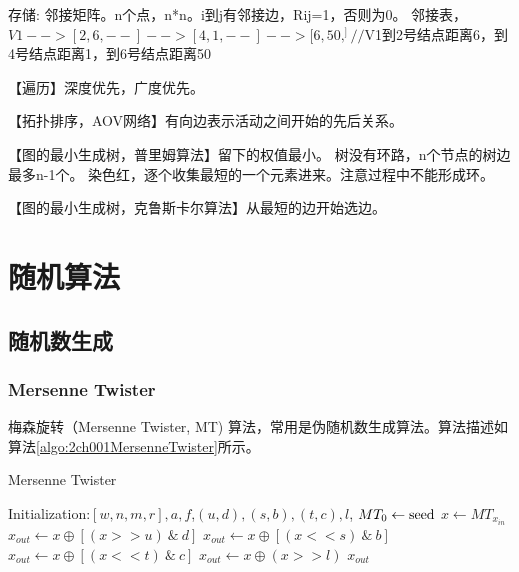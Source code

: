 \documentclass[UTF8]{../computerUniverse}
\begin{document}
存储: 
邻接矩阵。n个点，n*n。i到j有邻接边，Rij=1，否则为0。
邻接表，$V1-->[2,6,--]-->[4,1,--]-->[6,50,^]//$V1到2号结点距离6，到4号结点距离1，到6号结点距离50

【遍历】深度优先，广度优先。

【拓扑排序，AOV网络】有向边表示活动之间开始的先后关系。

【图的最小生成树，普里姆算法】留下的权值最小。
树没有环路，n个节点的树边最多n-1个。
染色红，逐个收集最短的一个元素进来。注意过程中不能形成环。

【图的最小生成树，克鲁斯卡尔算法】从最短的边开始选边。




\chapter{随机算法}


\section{随机数生成}

\subsection{Mersenne Twister}
梅森旋转（Mersenne Twister, MT) 算法，常用是伪随机数生成算法。算法描述如算法\ref{algo:2ch001MersenneTwister}所示。

      \begin{algorithm}[ht]
        \caption{Mersenne Twister}\label{algo:2ch001MersenneTwister}
        \SetAlgoLined
        Initialization:$[w, n, m, r], a, f$,$(u,d),(s,b),(t,c),l$, $MT_0 \leftarrow {\rm seed}$\;
        $x \leftarrow MT_{x_{in}}$\;
        $x_{out} \leftarrow x \oplus [ (x >> u) \ \& \  d]$\;
        $x_{out} \leftarrow x \oplus [ (x << s) \ \& \ b]$\;
        $x_{out} \leftarrow x \oplus [ (x << t) \ \& \  c]$\;
        $x_{out} \leftarrow x \oplus  (x >> l) $\;
        \KwRet $x_{out}$\;
      \end{algorithm}
\end{document}
